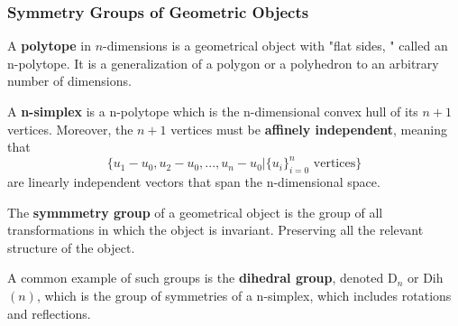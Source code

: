 \subsubsection{Symmetry Groups of Geometric Objects} 

  \begin{definition}[Polytope]
    A \textbf{polytope} in $n$-dimensions is a geometrical object with "flat sides, " called an n-polytope. It is a generalization of a polygon or a polyhedron to an arbitrary number of dimensions. 
  \end{definition}

  \begin{definition}[Simplex]
    A \textbf{n-simplex} is a n-polytope which is the n-dimensional convex hull of its $n+1$ vertices. Moreover, the $n+1$ vertices must be \textbf{affinely independent}, meaning that
    \begin{equation}
      \{u_1 - u_0, u_2 - u_0, ..., u_n - u_0 | \{u_i\}_{i=0}^{n} \text{ vertices} \}
    \end{equation}
    are linearly independent vectors that span the n-dimensional space. 
  \end{definition}

  \begin{definition}
    The \textbf{symmmetry group} of a geometrical object is the group of all transformations in which the object is invariant. Preserving all the relevant structure of the object. 
  \end{definition}

  \begin{definition}
    A common example of such groups is the \textbf{dihedral group}, denoted D$_{n}$ or Dih$(n)$, which is the group of symmetries of a n-simplex, which includes rotations and reflections. 
  \end{definition}

